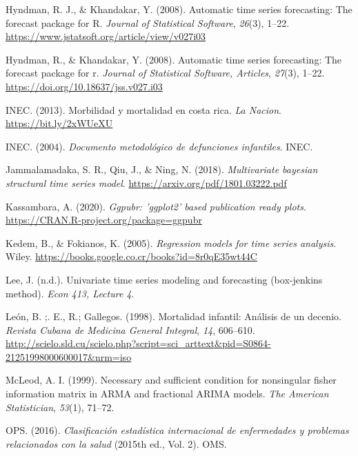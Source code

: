 \documentclass[
]{article}
\newlength{\cslhangindent}
\newlength{\cslentryspacingunit} %
\newenvironment{CSLReferences}[2] %
 {%
  \setlength{\parindent}{0pt}
  \ifodd #1
  \let\oldpar\par
  \def\par{\hangindent=\cslhangindent\oldpar}
  \fi
  \setlength{\parskip}{#2\cslentryspacingunit}
 }%
 {}
\begin{document}
\begin{CSLReferences}{1}{0}
\leavevmode{}%
Hyndman, R. J., \& Khandakar, Y. (2008). Automatic time series
forecasting: The forecast package for {R}. \emph{Journal of Statistical
Software}, \emph{26}(3), 1--22.
\url{https://www.jstatsoft.org/article/view/v027i03}

\leavevmode{}%
Hyndman, R., \& Khandakar, Y. (2008). Automatic time series forecasting:
The forecast package for r. \emph{Journal of Statistical Software,
Articles}, \emph{27}(3), 1--22.
\url{https://doi.org/10.18637/jss.v027.i03}

\leavevmode{}%
INEC. (2013). Morbilidad y mortalidad en costa rica. \emph{La Nacion}.
\url{https://bit.ly/2xWUeXU}

\leavevmode{}%
INEC. (2004). \emph{Documento metodológico de defunciones infantiles}.
INEC.

\leavevmode{}%
Jammalamadaka, S. R., Qiu, J., \& Ning, N. (2018). \emph{Multivariate
bayesian structural time series model}.
\url{https://arxiv.org/pdf/1801.03222.pdf}

\leavevmode{}%
Kassambara, A. (2020). \emph{Ggpubr: 'ggplot2' based publication ready
plots}. \url{https://CRAN.R-project.org/package=ggpubr}

\leavevmode{}%
Kedem, B., \& Fokianos, K. (2005). \emph{Regression models for time
series analysis}. Wiley.
\url{https://books.google.co.cr/books?id=8r0qE35wt44C}

\leavevmode{}%
Lee, J. (n.d.). Univariate time series modeling and forecasting
(box-jenkins method). \emph{Econ 413, Lecture 4}.

\leavevmode{}%
León, B. ;. E., R.; Gallegos. (1998). {Mortalidad infantil: Análisis de
un decenio}. \emph{{Revista Cubana de Medicina General Integral}},
\emph{14}, 606--610.
\url{http://scielo.sld.cu/scielo.php?script=sci_arttext\&pid=S0864-21251998000600017\&nrm=iso}

\leavevmode{}%
McLeod, A. I. (1999). Necessary and sufficient condition for nonsingular
fisher information matrix in ARMA and fractional ARIMA models. \emph{The
American Statistician}, \emph{53}(1), 71--72.

\leavevmode{}%
OPS. (2016). \emph{Clasificación estadística internacional de
enfermedades y problemas relacionados con la salud} (2015th ed., Vol.
2). OMS.


\end{CSLReferences}
\end{document}
